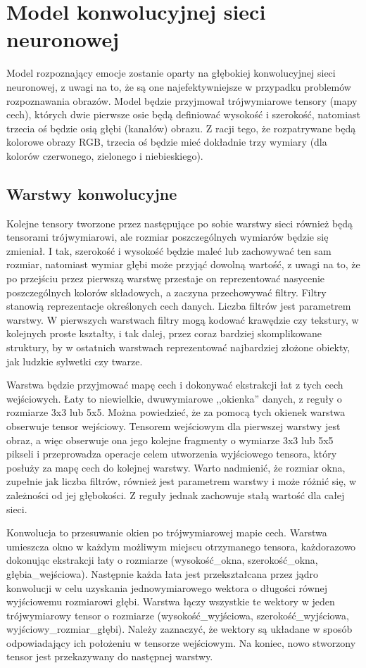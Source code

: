 \section{Model konwolucyjnej sieci neuronowej}
Model rozpoznający emocje zostanie oparty na głębokiej konwolucyjnej sieci neuronowej, z uwagi na to, że są one najefektywniejsze w przypadku problemów rozpoznawania obrazów. Model będzie przyjmował trójwymiarowe tensory (mapy cech), których dwie pierwsze osie będą definiować wysokość i szerokość, natomiast trzecia oś będzie osią głębi (kanałów) obrazu. Z racji tego, że rozpatrywane będą kolorowe obrazy RGB, trzecia oś będzie mieć dokładnie trzy wymiary (dla kolorów czerwonego, zielonego i niebieskiego).

\subsection{Warstwy konwolucyjne}
Kolejne tensory tworzone przez następujące po sobie warstwy sieci również będą tensorami trójwymiarowi, ale rozmiar poszczególnych wymiarów będzie się zmieniał. I tak, szerokość i wysokość będzie maleć lub zachowywać ten sam rozmiar, natomiast wymiar głębi może przyjąć dowolną wartość, z uwagi na to, że po przejściu przez pierwszą warstwę przestaje on reprezentować nasycenie poszczególnych kolorów składowych, a zaczyna przechowywać filtry. Filtry stanowią reprezentacje określonych cech danych. Liczba filtrów jest parametrem warstwy. W pierwszych warstwach filtry mogą kodować krawędzie czy tekstury, w kolejnych proste kształty, i tak dalej, przez coraz bardziej skomplikowane struktury, by w ostatnich warstwach reprezentować najbardziej złożone obiekty, jak ludzkie sylwetki czy twarze.

Warstwa będzie przyjmować mapę cech i dokonywać ekstrakcji łat z tych cech wejściowych. Łaty to niewielkie, dwuwymiarowe ,,okienka'' danych, z reguły o rozmiarze 3x3 lub 5x5. Można powiedzieć, że za pomocą tych okienek warstwa obserwuje tensor wejściowy. Tensorem wejściowym dla pierwszej warstwy jest obraz, a więc obserwuje ona jego kolejne fragmenty o wymiarze 3x3 lub 5x5 pikseli i przeprowadza operacje celem utworzenia wyjściowego tensora, który posłuży za mapę cech do kolejnej warstwy. Warto nadmienić, że rozmiar okna, zupełnie jak liczba filtrów, również jest parametrem warstwy i może różnić się, w zależności od jej głębokości. Z reguły jednak zachowuje stałą wartość dla całej sieci.

Konwolucja to przesuwanie okien po trójwymiarowej mapie cech. Warstwa umieszcza okno w każdym możliwym miejscu otrzymanego tensora, każdorazowo dokonując ekstrakcji łaty o rozmiarze (wysokość\_okna, szerokość\_okna, głębia\_wejściowa). Następnie każda łata jest przekształcana przez jądro konwolucji w celu uzyskania jednowymiarowego wektora o długości równej wyjściowemu rozmiarowi głębi. Warstwa łączy wszystkie te wektory w jeden trójwymiarowy tensor o rozmiarze (wysokość\_wyjściowa, szerokość\_wyjściowa, wyjściowy\_rozmiar\_głębi). Należy zaznaczyć, że wektory są układane w sposób odpowiadający ich położeniu w tensorze wejściowym. Na koniec, nowo stworzony tensor jest przekazywany do następnej warstwy.

